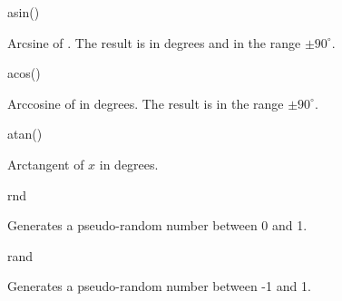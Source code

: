 \begin{math-function}{asin()}

	Arcsine of . The result is in degrees and in the range $\pm90^\circ$.

\begin{codeexample}[]
 \pgfmathresult
\end{codeexample}

\end{math-function}

\begin{math-function}{acos()}

	Arccosine of  in degrees. The result is in the range $\pm90^\circ$.


\begin{codeexample}[]
 \pgfmathresult
\end{codeexample}

\end{math-function}

\begin{math-function}{atan()}

	Arctangent of $x$ in degrees. 

\begin{codeexample}[]
 \pgfmathresult
\end{codeexample}

\end{math-function}

\begin{math-function}{rnd}

	Generates a pseudo-random number between 0 and 1.

\begin{codeexample}[]
 \pgfmathresult
\end{codeexample}

\begin{codeexample}[]
 \pgfmathresult
\end{codeexample}

\begin{codeexample}[]
 \pgfmathresult
\end{codeexample}

\end{math-function}

\begin{math-function}{rand}

	Generates a pseudo-random number between -1 and 1.

\begin{codeexample}[]
 \pgfmathresult
\end{codeexample}

\begin{codeexample}[]
 \pgfmathresult
\end{codeexample} 

\end{math-function}


